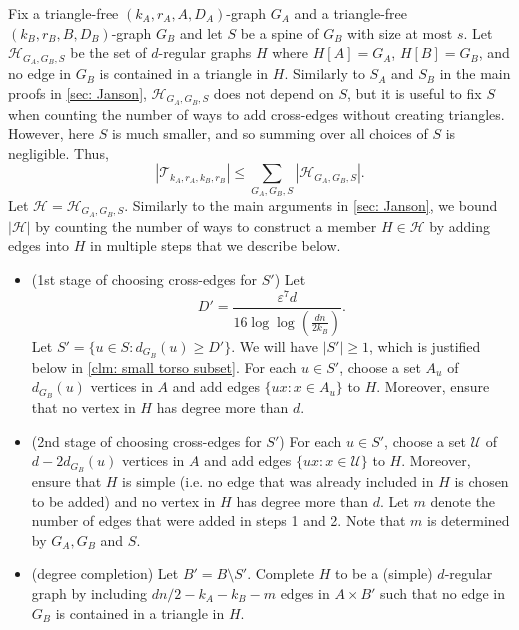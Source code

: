 \documentclass[11pt]{article}
\theoremstyle{plain}
\begin{document}
Fix a triangle-free $(k_A, r_A, A, D_A)$-graph $G_A$ and a triangle-free $(k_B, r_B, B, D_B)$-graph $G_B$ and let $S$ be a spine of $G_B$ with size at most $s$. Let $\mathcal H_{G_A, G_B, S}$ be the set of $d$-regular graphs $H$ where $H[A] = G_A$, $H[B] = G_B$, and no edge in $G_B$ is contained in a triangle in $H$. Similarly to $S_A$ and $S_B$ in the main proofs in \cref{sec: Janson}, $\mathcal H_{G_A, G_B, S}$ does not depend on $S$, but it is useful to fix $S$ when counting the number of ways to add cross-edges without creating triangles. However, here $S$ is much smaller, and so summing over all choices of $S$ is negligible. Thus,
\begin{equation}\label{eq: small torso 1 sum}
    |\mathcal T_{k_A, r_A, k_B, r_B}| \leq \sum_{G_A, G_B, S}|\mathcal H_{G_A, G_B, S}|.
\end{equation}
Let $\mathcal H = \mathcal H_{G_A, G_B, S}$. 
Similarly to the main arguments in \cref{sec: Janson}, we bound $|\mathcal H |$ by counting the number of ways to construct a member $H\in\mathcal{H}$ by adding edges into $H$ in multiple steps that we describe below.

\begin{itemize}
    
    \item[1.](1st stage of choosing cross-edges for $S'$) Let 
    \[
    D' = \frac{\varepsilon^7d}{16\log\log\left(\frac{dn}{2k_B}\right)}.
    \]
    Let $S' = \{u \in S \mathrel : d_{G_B}(u) \geq D'\}$. We will have $|S'| \geq 1$, which is justified below in \cref{clm: small torso subset}. For each $u \in S'$, choose a set $A_u$ of $d_{G_B}(u)$ vertices in $A$ and add edges $\{ux \mathrel : x \in  A_u\}$ to $H$. Moreover, ensure that no vertex in $H$ has degree more than $d$.
    \item[2.](2nd stage of choosing cross-edges for $S'$) For each $u \in S'$, choose a set $\mathcal U$ of $d - 2d_{G_B}(u)$ vertices in $A$ and add edges $\{ux \mathrel : x \in \mathcal U\}$ to $H$. Moreover, ensure that $H$ is simple (i.e. no edge that was already included in $H$ is chosen to be added) and no vertex in $H$ has degree more than $d$. Let $m$ denote the number of edges that were added in steps 1 and 2. Note that $m$ is determined by $G_A,G_B$ and $S$.
    \item[3.](degree completion) Let $B' = B \setminus S'$. Complete $H$ to be a (simple) $d$-regular graph by including $dn/2 - k_A - k_B - m$ edges in $A \times B'$ such that no edge in $G_B$ is contained in a triangle in $H$.
\end{itemize}
\end{document}
